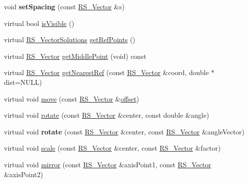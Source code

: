 \begin{DoxyCompactItemize}
\item 
\hypertarget{classRS__Insert_aef7589d783d851df0850403cf00ab556}{void {\bfseries set\-Spacing} (const \hyperlink{classRS__Vector}{R\-S\-\_\-\-Vector} \&s)}\label{classRS__Insert_aef7589d783d851df0850403cf00ab556}

\item 
virtual bool \hyperlink{classRS__Insert_a894ee62da0819c6d73e33ecdc2124484}{is\-Visible} ()
\item 
virtual \hyperlink{classRS__VectorSolutions}{R\-S\-\_\-\-Vector\-Solutions} \hyperlink{classRS__Insert_afef966616200c0c42930a54d17cd18d3}{get\-Ref\-Points} ()
\item 
virtual \hyperlink{classRS__Vector}{R\-S\-\_\-\-Vector} \hyperlink{classRS__Insert_a71a2b57f0adb0561be5c13a2d4c7e328}{get\-Middle\-Point} (void) const 
\item 
virtual \hyperlink{classRS__Vector}{R\-S\-\_\-\-Vector} \hyperlink{classRS__Insert_afd4f8039e23ec7a252eb5ac65cea1b78}{get\-Nearest\-Ref} (const \hyperlink{classRS__Vector}{R\-S\-\_\-\-Vector} \&coord, double $\ast$dist=N\-U\-L\-L)
\item 
virtual void \hyperlink{classRS__Insert_a97cfdd5e560d771032e1b5cad5580b5c}{move} (const \hyperlink{classRS__Vector}{R\-S\-\_\-\-Vector} \&\hyperlink{classRS__Entity_aa296d21b9aac99161d386ce2f60f0fea}{offset})
\item 
virtual void \hyperlink{classRS__Insert_a8881589b5f43d90cc7eab8236954b409}{rotate} (const \hyperlink{classRS__Vector}{R\-S\-\_\-\-Vector} \&center, const double \&angle)
\item 
\hypertarget{classRS__Insert_ab965d0a4e0ab90f569fe90fc5fc063b7}{virtual void {\bfseries rotate} (const \hyperlink{classRS__Vector}{R\-S\-\_\-\-Vector} \&center, const \hyperlink{classRS__Vector}{R\-S\-\_\-\-Vector} \&angle\-Vector)}\label{classRS__Insert_ab965d0a4e0ab90f569fe90fc5fc063b7}

\item 
virtual void \hyperlink{classRS__Insert_a316f5f8d359be3df27fc7ee42ebeeafd}{scale} (const \hyperlink{classRS__Vector}{R\-S\-\_\-\-Vector} \&center, const \hyperlink{classRS__Vector}{R\-S\-\_\-\-Vector} \&factor)
\item 
virtual void \hyperlink{classRS__Insert_a62bcdb401a7246804f03cef0884c07da}{mirror} (const \hyperlink{classRS__Vector}{R\-S\-\_\-\-Vector} \&axis\-Point1, const \hyperlink{classRS__Vector}{R\-S\-\_\-\-Vector} \&axis\-Point2)
\end{DoxyCompactItemize}
